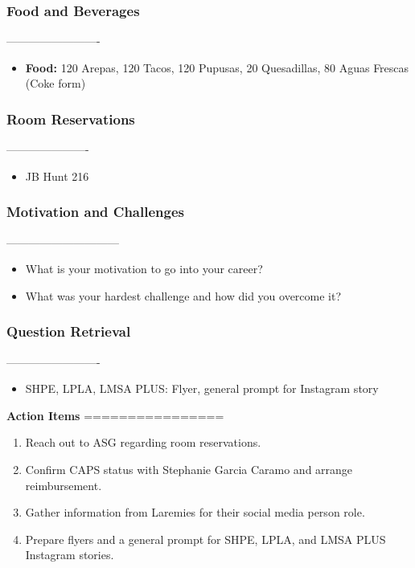 \documentclass[11pt,a4paper]{article}
\begin{document}
\subsubsection*{Food and Beverages}
-------------------------

\begin{itemize}
  \item   \textbf{Food:} 120 Arepas, 120 Tacos, 120 Pupusas, 20 Quesadillas, 80 Aguas Frescas (Coke form)
\end{itemize}

\subsubsection*{Room Reservations}
----------------------

\begin{itemize}
  \item   JB Hunt 216
\end{itemize}

\subsubsection*{Motivation and Challenges}
------------------------------

\begin{itemize}
  \item   What is your motivation to go into your career?
  \item   What was your hardest challenge and how did you overcome it?
\end{itemize}

\subsubsection*{Question Retrieval}
-------------------------

\begin{itemize}
  \item   SHPE, LPLA, LMSA PLUS: Flyer, general prompt for Instagram story
\end{itemize}

\textbf{Action Items}
================

\begin{enumerate}
  \item  Reach out to ASG regarding room reservations.
  \item  Confirm CAPS status with Stephanie Garcia Caramo and arrange reimbursement.
  \item  Gather information from Laremies for their social media person role.
  \item  Prepare flyers and a general prompt for SHPE, LPLA, and LMSA PLUS Instagram stories.
\end{enumerate}
\end{document}
